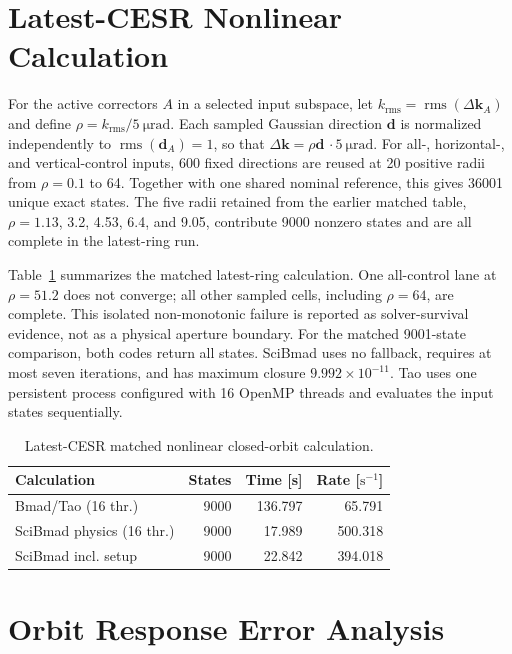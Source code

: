 \documentclass[letterpaper]{jacow}
\begin{document}
\section{Latest-CESR Nonlinear Calculation}

For the active correctors $A$ in a selected input subspace, let
$k_{\mathrm{rms}}=\operatorname{rms}(\Delta\bm k_A)$ and define
$\rho=k_{\mathrm{rms}}/\qty{5}{\micro\radian}$.  Each sampled Gaussian
direction $\bm d$ is normalized independently to
$\operatorname{rms}(\bm d_A)=1$, so that
$\Delta\bm k=\rho\bm d\,\cdot \qty{5}{\micro\radian}$. For all-, horizontal-,
and vertical-control inputs, 600 fixed directions are reused at 20 positive
radii from $\rho=0.1$ to 64. Together with one shared nominal reference, this
gives 36001 unique exact states. The five radii retained from the earlier
matched table, $\rho=1.13$, 3.2, 4.53, 6.4, and 9.05, contribute 9000 nonzero
states and are all complete in the latest-ring run.

Table~\ref{tab:nonlinear-calculation} summarizes the matched latest-ring
calculation.
One all-control lane at $\rho=51.2$ does not converge; all other sampled cells,
including $\rho=64$, are complete. This isolated non-monotonic failure is
reported as solver-survival evidence, not as a physical aperture boundary.
For the matched 9001-state comparison, both codes return all states. SciBmad
uses no fallback, requires at most seven iterations, and has maximum closure
$9.992\times10^{-11}$. Tao uses one persistent process configured with 16
OpenMP threads and evaluates the input states sequentially.

\begin{table}[!htb]
  \centering
  \caption{Latest-CESR matched nonlinear closed-orbit calculation.}
  \footnotesize
  \begin{tabular}{@{}lrrr@{}}
    \toprule
    \textbf{Calculation} & \textbf{States} & \textbf{Time [s]} &
    \textbf{Rate [$\mathrm{s}^{-1}$]} \\
    \midrule
    Bmad/Tao (16 thr.) & 9000 & 136.797 & 65.791 \\
    SciBmad physics (16 thr.) & 9000 & 17.989 & 500.318 \\
    SciBmad incl. setup & 9000 & 22.842 & 394.018 \\
    \bottomrule
  \end{tabular}
  \label{tab:nonlinear-calculation}
\end{table}

\section{Orbit Response Error Analysis}
\end{document}
